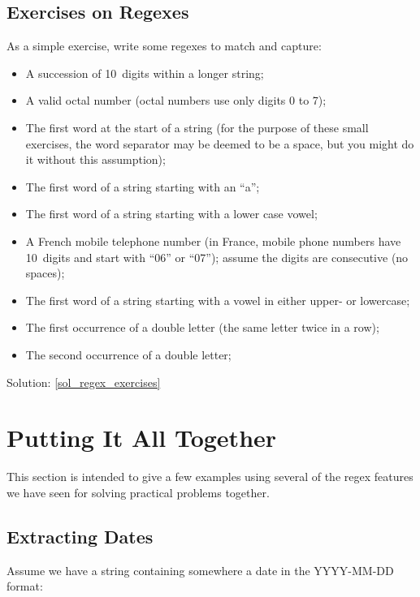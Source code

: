 \subsection{Exercises on Regexes}
\label{regex_exercises}

As a simple exercise, write some regexes to match and capture:

\begin{itemize}
\item A succession of 10~digits within a longer string;
\item A valid octal number (octal numbers use only 
digits 0 to 7);
\item The first word at the start of a string (for the 
purpose of these small exercises, the word 
separator may be deemed to be a space, but you might do 
it without this assumption);
\item The first word of a string starting with an ``a'';
\item The first word of a string starting with a lower case vowel;
\item A French mobile telephone number (in France, mobile 
phone numbers have 10~digits and start with ``06'' or ``07''); 
assume the digits are consecutive (no spaces);
\item The first word of a string starting with a vowel in 
either upper- or lowercase;
\item The first occurrence of a double letter (the
same letter twice in a row);
\item The second occurrence of a double letter;
 
\end{itemize}

Solution: \ref{sol_regex_exercises}
 

\section{Putting It All Together}

This section is intended to give a few examples using 
several of the regex features we have seen for solving practical 
problems together.

\subsection{Extracting Dates}
\label{extracting_dates}

Assume we have a string containing somewhere a 
date in the YYYY-MM-DD format:

